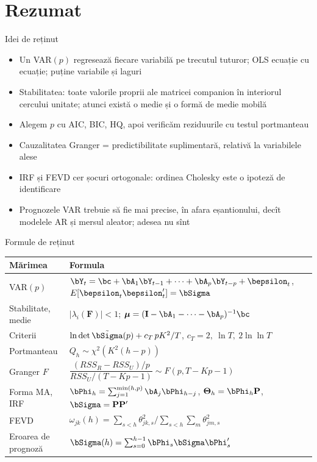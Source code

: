\section{Rezumat}

\begin{frame}{Idei de reținut}
\itemsize{\small}
\begin{itemize}
    \item Un VAR$(p)$ regresează fiecare variabilă pe trecutul tuturor; OLS ecuație cu ecuație; puține variabile și laguri
    \item Stabilitatea: toate valorile proprii ale matricei companion în interiorul cercului unitate; atunci există o medie și o formă de medie mobilă
    \item Alegem $p$ cu AIC, BIC, HQ, apoi verificăm reziduurile cu testul portmanteau
    \item Cauzalitatea Granger = predictibilitate suplimentară, relativă la variabilele alese
    \item IRF și FEVD cer șocuri ortogonale: ordinea Cholesky este o ipoteză de identificare
    \item Prognozele VAR trebuie să fie mai precise, în afara eșantionului, decît modelele AR și mersul aleator; adesea nu sînt
\end{itemize}
\end{frame}

\begin{frame}{Formule de reținut}
\itemsize{\small}
{\renewcommand{\arraystretch}{1.35}\begin{center}
\footnotesize
\begin{tabular}{ll}
\toprule
\textbf{Mărimea} & \textbf{Formula} \\
\midrule
VAR$(p)$ & $\bY_t = \bc + \bA_1\bY_{t-1} + \dots + \bA_p\bY_{t-p} + \bepsilon_t$, \quad $E[\bepsilon_t\bepsilon_t'] = \bSigma$ \\
Stabilitate, medie & $|\lambda_i(\mathbf{F})| < 1$; \quad $\boldsymbol{\mu} = (\mathbf{I} - \bA_1 - \dots - \bA_p)^{-1}\bc$ \\
Criterii & $\ln\det\tilde\bSigma(p) + c_T\,pK^2/T$, \quad $c_T = 2,\ \ln T,\ 2\ln\ln T$ \\
Portmanteau & $Q_h \sim \chi^2(K^2(h - p))$ \\
Granger $F$ & $\dfrac{(RSS_R - RSS_U)/p}{RSS_U/(T - Kp - 1)} \sim F(p, T - Kp - 1)$ \\
Forma MA, IRF & $\bPhi_h = \sum_{j=1}^{\min(h,p)}\bA_j\bPhi_{h-j}$, \quad $\boldsymbol{\Theta}_h = \bPhi_h\mathbf{P}$, \quad $\bSigma = \mathbf{P}\mathbf{P}'$ \\
FEVD & $\omega_{jk}(h) = \sum_{s<h}\theta_{jk,s}^2 / \sum_{s<h}\sum_m\theta_{jm,s}^2$ \\
Eroarea de prognoză & $\bSigma(h) = \sum_{s=0}^{h-1}\bPhi_s\bSigma\bPhi_s'$ \\
\bottomrule
\end{tabular}
\end{center}
}
\end{frame}

